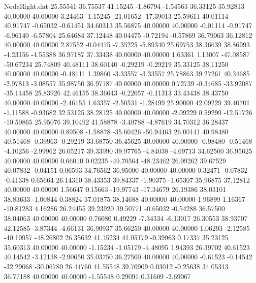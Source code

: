 \begin{filecontents}{NodeRight.dat}
  25.55541   36.75537   41.15245    -1.86794   -1.54563   36.33125   35.92813   40.00000   40.00000    3.24463   -1.15245  -21.01652  -17.39013
  25.59611   40.01114   40.91747    -0.65032   -0.61451   34.60313   35.56875   40.00000   40.00000   -0.01114   -0.91747   -6.96140   -6.57804
  25.64684   37.12448   40.04475    -0.72194   -0.57869   36.79063   36.12812   40.00000   40.00000    2.87552   -0.04475   -7.35225   -5.89340
  25.69753   38.36639   38.86993    -4.23156   -4.55388   36.97187   37.33438   40.00000   40.00000    1.63361    1.13007  -47.08587  -50.67234
  25.74809   40.48111   38.60140    -0.29219   -0.29219   35.33125   38.11250   40.00000   40.00000   -0.48111    1.39860   -3.33557   -3.33557
  25.78863   39.27261   40.34685    -2.97813   -3.08557   35.98750   36.97187   40.00000   40.00000    0.72739   -0.34685  -33.92087  -35.14458
  25.83926   42.46155   38.36643    -0.22057   -0.11313   33.43438   38.43750   40.00000   40.00000   -2.46155    1.63357   -2.50531   -1.28499
  25.90000   42.09229   39.40701    -1.11588   -0.93682   32.53125   38.28125   40.00000   40.00000   -2.09229    0.59299  -12.51726  -10.50865
  25.95076   39.10492   41.58878    -3.40788   -4.87619   34.70312   36.28437   40.00000   40.00000    0.89508   -1.58878  -35.60426  -50.94463
  26.00141   40.98480   40.51468    -0.39963   -0.29219   33.68750   36.45625   40.00000   40.00000   -0.98480   -0.51468   -4.10256   -2.99962
  26.05217   39.33990   39.97765    -4.84038   -4.69713   34.62500   36.95625   40.00000   40.00000    0.66010    0.02235  -49.70564  -48.23462
  26.09262   39.67529   40.07832    -0.04151    0.06593   34.76562   36.95000   40.00000   40.00000    0.32471   -0.07832   -0.41338    0.65664
  26.14310   38.43353   39.84337    -1.90375   -1.65307   35.96875   37.12812   40.00000   40.00000    1.56647    0.15663  -19.97743  -17.34679
  26.19386   38.03101   38.83633    -1.00844    0.38824   37.01875   38.14688   40.00000   40.00000    1.96899    1.16367  -10.81283    4.16286
  26.24455   39.23920   39.50771    -0.65032   -0.54288   36.57500   38.04063   40.00000   40.00000    0.76080    0.49229   -7.34334   -6.13017
  26.30553   38.93707   42.12585    -3.87344   -4.66131   36.90937   35.66250   40.00000   40.00000    1.06293   -2.12585  -40.10957  -48.26802
  26.35632   41.15234   41.05179    -0.39963    0.17337   35.23125   35.60313   40.00000   40.00000   -1.15234   -1.05179   -4.48095    1.94393
  26.39702   40.61523   40.14542    -3.12138   -2.90650   35.03750   36.27500   40.00000   40.00000   -0.61523   -0.14542  -32.29068  -30.06780
  26.44760   41.55548   39.70909     0.03012   -0.25638   34.05313   36.77188   40.00000   40.00000   -1.55548    0.29091    0.31609   -2.69067

\end{filecontents}

